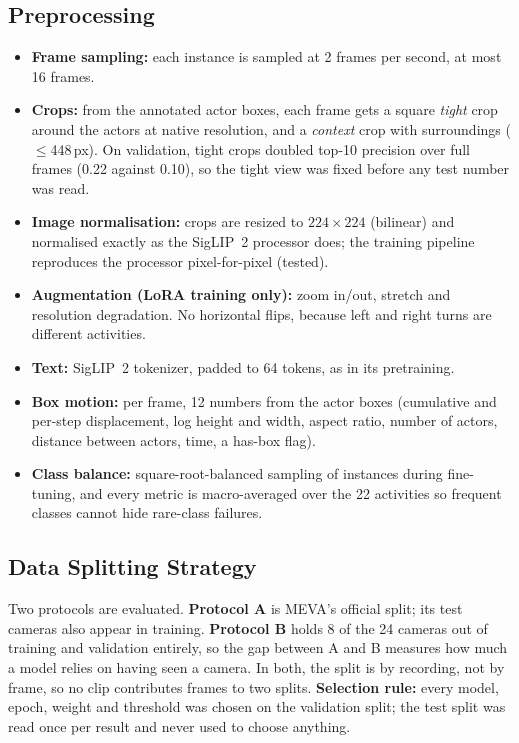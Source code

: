 \documentclass[11pt,a4paper]{article}
\begin{document}
\subsection{Preprocessing}
\begin{itemize}
  \item \textbf{Frame sampling:} each instance is sampled at 2 frames per second, at most 16 frames.
  \item \textbf{Crops:} from the annotated actor boxes, each frame gets a square \emph{tight} crop around the actors at
        native resolution, and a \emph{context} crop with surroundings ($\le$448\,px). On validation, tight crops
        doubled top-10 precision over full frames (0.22 against 0.10), so the tight view was fixed before any test
        number was read.
  \item \textbf{Image normalisation:} crops are resized to $224\times224$ (bilinear) and normalised exactly as the
        SigLIP~2 processor does; the training pipeline reproduces the processor pixel-for-pixel (tested).
  \item \textbf{Augmentation (LoRA training only):} zoom in/out, stretch and resolution degradation. No horizontal
        flips, because left and right turns are different activities.
  \item \textbf{Text:} SigLIP~2 tokenizer, padded to 64 tokens, as in its pretraining.
  \item \textbf{Box motion:} per frame, 12 numbers from the actor boxes (cumulative and per-step displacement, log
        height and width, aspect ratio, number of actors, distance between actors, time, a has-box flag).
  \item \textbf{Class balance:} square-root-balanced sampling of instances during fine-tuning, and every metric is
        macro-averaged over the 22 activities so frequent classes cannot hide rare-class failures.
\end{itemize}

\subsection{Data Splitting Strategy}
Two protocols are evaluated. \textbf{Protocol A} is MEVA's official split; its test cameras also appear in
training. \textbf{Protocol B} holds 8 of the 24 cameras out of training and validation entirely, so the gap between
A and B measures how much a model relies on having seen a camera. In both, the split is by recording, not by
frame, so no clip contributes frames to two splits. \textbf{Selection rule:} every model, epoch, weight and
threshold was chosen on the validation split; the test split was read once per result and never used to choose
anything.
\end{document}
